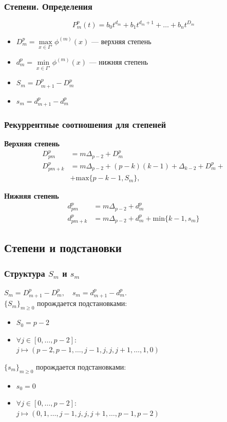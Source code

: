 \begin{frame}
\frametitle{Степени. Определения}

$$P_m^p(t) = b_0 t^{d_m} + b_1 t^{d_{m}+1} + \ldots + b_{n}t^{D_m}$$
\begin{itemize}
\item$D_m^p = \max\limits_{x \in \Gamma'} \phi^{(m)}(x)$ --- верхняя степень
\item$d_m^p = \min\limits_{x \in \Gamma'} \phi^{(m)}(x)$ --- нижняя степень
\item$S_m = D_{m+1}^p - D_{m}^p$
\item$s_m = d_{m+1}^p - d_m^p$
\end{itemize}
\end{frame}


\begin{frame}
\frametitle{Рекуррентные соотношения для степеней}

\textbf{Верхняя степень}
\begin{align*}
  D_{pm}^p &= m \Delta_{p-2} + D_m^p \\
  D_{pm+k}^p &= m \Delta_{p-2}+(p-k)(k-1)+\Delta_{k-2}+D_m^p+\\
   &+ \mathrm{max}\{p-k-1, S_m\},
\end{align*}

\textbf{Нижняя степень}
\begin{align*}
  d_{pm}^p &= m \Delta_{p-2} + d_m^p \\
  d_{pm+k}^p &= m \Delta_{p-2}+d_m^p + \mathrm{min}\{k-1, s_m\}
\end{align*}
\end{frame}

\subsection{Степени и подстановки}
\begin{frame}
\frametitle{Структура $S_m$ и $s_m$}
$S_m = D_{m+1}^p-D_m^p, \quad s_m = d_{m+1}^p-d_m^p$.\bigskip\\

 $\{S_m\}_{m \ge 0}$ порождается подстановками:
\begin{itemize}
\item $S_0 = p-2$
\item $\forall j \in \left[0, \ldots, p-2 \right]: $\\$ j \mapsto (p-2, p-1,\ldots,j - 1, j, j , j+1, \ldots, 1, 0)$
\end{itemize}
\bigskip
 $\{s_m\}_{m \ge 0}$ порождается подстановками:
\begin{itemize}
\item $s_0 = 0$
\item $\forall j \in \left[0, \ldots, p-2 \right]: $\\$ j \mapsto (0, 1,\ldots,j - 1, j, j , j+1, \ldots, p-1, p-2)$
\end{itemize}
\end{frame}

